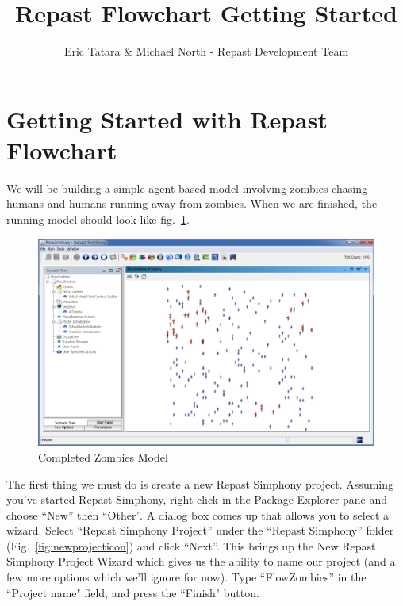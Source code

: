 \documentclass[11pt]{amsart}
\title{Repast Flowchart Getting Started}
\author{Eric Tatara \& Michael North - Repast Development Team}
\begin{document}
 
\maketitle
\setcounter{section}{-1}



\section{Getting Started with Repast Flowchart}
We will be building a simple agent-based model involving zombies chasing humans and humans running away from zombies. When we are finished, the running model should look like fig.~\ref{fig:final}.

\begin{figure}[h]
\begin{center}
\vspace{.2in}
\centerline {
\includegraphics[width=5in]{figs/final.eps}
}
\caption{Completed Zombies Model}
\label{fig:final}
\end{center}
\end{figure}

The first thing we must do is create a new Repast Simphony project. Assuming you've started Repast Simphony, right click in the Package Explorer pane and choose ``New'' then ``Other''. A dialog box comes up that allows you to select a wizard. Select ``Repast Simphony Project'' under the ``Repast Simphony'' folder (Fig.~\ref{fig:newprojecticon}) and click ``Next''. This brings up the New Repast Simphony Project Wizard  which gives us the ability to name our project (and a few more options which we'll ignore for now). Type ``FlowZombies'' in the ``Project name" field, and press the ``Finish" button.
\end{document}
